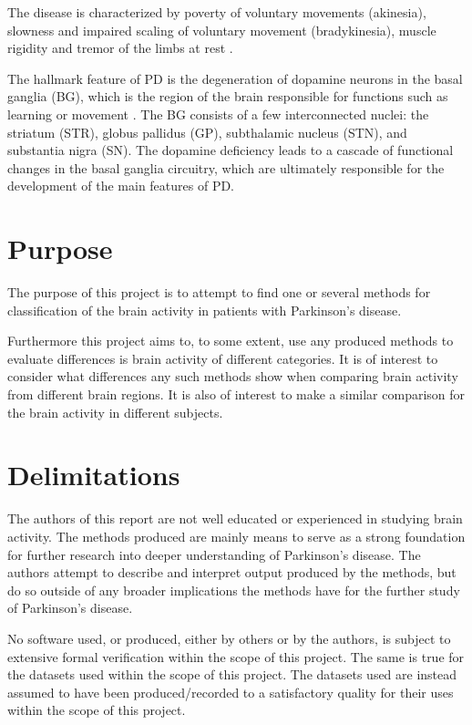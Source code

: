 \documentclass{kththesis}
\begin{document}
The disease is characterized by poverty of voluntary movements (akinesia), slowness and impaired scaling of voluntary movement (bradykinesia), muscle rigidity and tremor of the limbs at rest \parencite{DeMaags}.

The hallmark feature of PD is the degeneration of dopamine neurons in the basal ganglia (BG), which is the region of the brain responsible for functions such as learning or movement \parencite{Hammond}. 
The BG consists of a few interconnected nuclei: the striatum (STR), globus pallidus (GP), subthalamic nucleus (STN), and substantia nigra (SN). 
The dopamine deficiency leads to a cascade of functional changes in the basal ganglia circuitry, which are ultimately responsible for the development of the main features of PD.

\section{Purpose}

The purpose of this project is to attempt to find one or several methods for classification of the brain activity in patients with Parkinson's disease.

Furthermore this project aims to, to some extent, use any produced methods to evaluate differences is brain activity of different categories.
It is of interest to consider what differences any such methods show when comparing brain activity from different brain regions.
It is also of interest to make a similar comparison for the brain activity in different subjects.

\section{Delimitations}

The authors of this report are not well educated or experienced in studying brain activity.
The methods produced are mainly means to serve as a strong foundation for further research into deeper understanding of Parkinson's disease.
The authors attempt to describe and interpret output produced by the methods, but do so outside of any broader implications the methods have for the further study of Parkinson's disease.

No software used, or produced, either by others or by the authors, is subject to extensive formal verification within the scope of this project. 
The same is true for the datasets used within the scope of this project.
The datasets used are instead assumed to have been produced/recorded to a satisfactory quality for their uses within the scope of this project.
\end{document}
